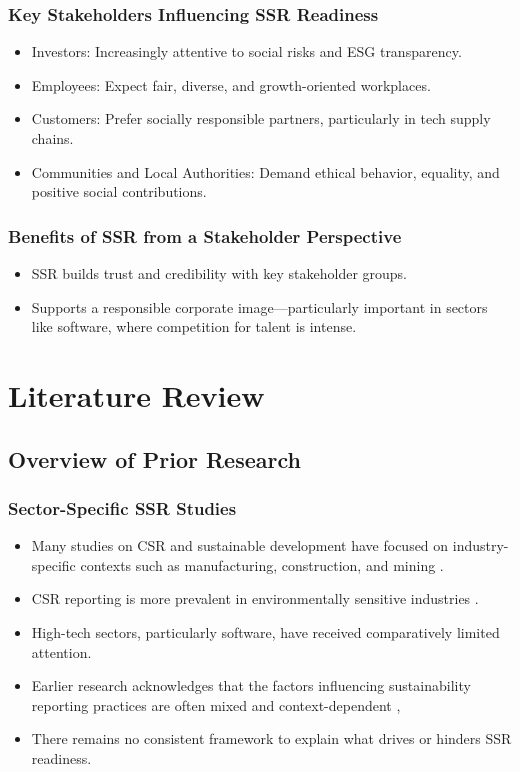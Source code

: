 \subsubsection{Key Stakeholders Influencing SSR Readiness}
\begin{itemize}
    \item Investors: Increasingly attentive to social risks and ESG transparency.
    \item Employees: Expect fair, diverse, and growth-oriented workplaces.
    \item Customers: Prefer socially responsible partners, particularly in tech supply chains.
    \item Communities and Local Authorities: Demand ethical behavior, equality, and positive social contributions.
\end{itemize}

\subsubsection{Benefits of SSR from a Stakeholder Perspective}
\begin{itemize}
    \item SSR builds trust and credibility with key stakeholder groups.
    \item Supports a responsible corporate image—particularly important in sectors like software, where competition for talent is intense.
\end{itemize}

\section{Literature Review}

\subsection{Overview of Prior Research}
\subsubsection{Sector-Specific SSR Studies}
\begin{itemize}
    \item Many studies on CSR and sustainable development have focused on industry-specific contexts such as manufacturing, construction, and mining \parencite{Ye2020, Afshari2022}. 
    \item CSR reporting is more prevalent in environmentally sensitive industries \parencite{Lock2016}. 
    \item High-tech sectors, particularly software, have received comparatively limited attention. 
    \item Earlier research acknowledges that the factors influencing sustainability reporting practices are often mixed and context-dependent \parencite{Fifka2012}, 
    \item There remains no consistent framework to explain what drives or hinders SSR readiness.
\end{itemize}

